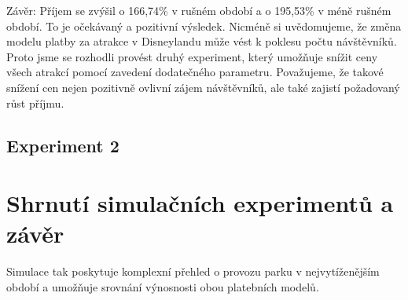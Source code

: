 \documentclass[a4paper,12pt]{article}
\begin{document}
Závěr: Příjem se zvýšil o 166,74\% v rušném období a o 195,53\%  v méně rušném období. To je očekávaný a pozitivní výsledek. Nicméně si uvědomujeme, že změna modelu platby za atrakce v Disneylandu může vést k poklesu počtu návštěvníků. Proto jsme se rozhodli provést druhý experiment, který umožňuje snížit ceny všech atrakcí pomocí zavedení dodatečného parametru. Považujeme, že takové snížení cen nejen pozitivně ovlivní zájem návštěvníků, ale také zajistí požadovaný růst příjmu.

\subsection{Experiment 2}

\section{Shrnutí simulačních experimentů a závěr}
Simulace tak poskytuje komplexní přehled o provozu parku v nejvytíženějším období a umožňuje srovnání výnosnosti obou platebních modelů.

 
\end{document}
